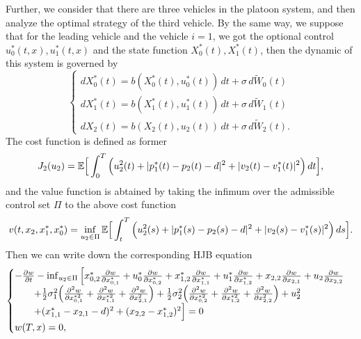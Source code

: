 \documentclass{article}
\begin{document}
Further, we consider that there are three vehicles in the platoon system, and then analyze the optimal strategy of the third vehicle. By the same way, we suppose that for the leading vehicle and the vehicle $i = 1$, we got the optional control $u_{0}^{*} (t, x), u_{1}^{*} (t, x)$ and the state function $X_{0}^{*} (t), X_{1}^{*} (t)$, then the dynamic of this system is governed by
\begin{equation}
    \begin{cases}
   d X_{0}^{*}(t) = b(X_{0}^{*}(t), u_{0}^{*}(t)) \, d t + \sigma \, d \widetilde{W}_{0}(t)  \\
   d X_{1}^{*}(t) = b(X_{1}^{*} (t), u_{1}^{*} (t)) \, d t + \sigma \, d \widetilde{W}_{1}(t) \\
   d X_{2}(t) = b(X_{2} (t), u_{2} (t)) \, d t + \sigma \, d \widetilde{W}_{2}(t).
   \end{cases}
\end{equation}
The cost function is defined as former
\begin{equation*}
    J_{2} (u_{2}) = \mathbb{E} \Big{[} \int_{0}^{T} \Big{(} u_{2}^{2}(t) + |p_{1}^{*}(t) - p_{2}(t) - d|^{2} + |v_{2}(t) - v_{1}^{*}(t)|^{2} \Big{)} \, d t \Big{]},
\end{equation*}
and the value function is abtained by taking the infimum over the admissible control set $\Pi$ to the above cost function
\begin{equation*}
    v(t, x_{2}, x_{1}^{*}, x_{0}^{*}) = \inf_{u_{2} \in \Pi} \mathbb{E} \Big{[} \int_{t}^{T} \Big{(} u_{2}^{2}(s) + |p_{1}^{*}(s) - p_{2}(s) - d|^{2} + |v_{2}(s) - v_{1}^{*}(s)|^{2} \Big{)} \, d s \Big{]}.
\end{equation*}
Then we can write down the corresponding HJB equation
\begin{equation} \label{HJB, N=2}
    \begin{cases}
   - \frac{\partial w}{\partial t} - \inf_{u_{2} \in \Pi} \Big{[} x_{0,2}^{*} \frac{\partial w}{\partial x_{0, 1}^{*}} + u_{0}^{*} \frac{\partial w}{\partial x_{0, 2}^{*}} + x_{1,2}^{*} \frac{\partial w}{\partial x_{1, 1}^{*}} + u_{1}^{*} \frac{\partial w}{\partial x_{1, 2}^{*}} + x_{2,2} \frac{\partial w}{\partial x_{2, 1}} + u_{2} \frac{\partial w}{\partial x_{2, 2}} \\
   \qquad + \frac{1}{2} \sigma_{1}^{2} \Big{(} \frac{\partial^{2} w}{\partial x_{0, 1}^{* 2}} + \frac{\partial^{2} w}{\partial x_{1, 1}^{* 2}} + \frac{\partial^{2} w}{\partial x_{2, 1}^{2}} \Big{)} + \frac{1}{2} \sigma_{2}^{2} \Big{(} \frac{\partial^{2} w}{\partial x_{0, 2}^{* 2}}  + \frac{\partial^{2} w}{\partial x_{1, 2}^{* 2}} + \frac{\partial^{2} w}{\partial x_{2, 2}^{2}} \Big{)} + u_{2}^{2} \\
   \qquad + (x_{1, 1}^{*} - x_{2, 1} - d)^{2} + (x_{2, 2} - x_{1, 2}^{*})^{2}  \Big{]}   = 0  \\
   w(T, x) = 0,
   \end{cases}
\end{equation}
\end{document}
